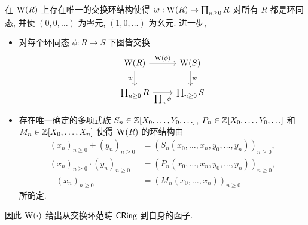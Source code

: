 \begin{theorem}\label{prop:Witt-ring}
	在 $\operatorname{W}(R)$ 上存在唯一的交换环结构使得 $w: \operatorname{W}(R) \to \prod_{n \geq 0} R$ 对所有 $R$ 都是环同态, 并使 $(0,0, \ldots)$ 为零元, $(1,0,\ldots)$ 为幺元. 进一步,
	\begin{itemize}
		\item 对每个环同态 $\phi: R \to S$ 下图皆交换
		\[\begin{tikzcd}
		\WittV(R) \arrow[d, "w"'] \arrow[r, "\WittV(\phi)"] & \WittV(S) \arrow[d, "w"] \\
		\prod_{n \geq 0} R \arrow[r, "\prod_n \phi"'] & \prod_{n \geq 0} S
		\end{tikzcd}\]
		\item 存在唯一确定的多项式族 $S_n \in \mathbb{Z}[X_0, \ldots, Y_0, \ldots]$, $P_n \in \mathbb{Z}[X_0, \ldots, Y_0, \ldots]$ 和 $M_n \in \mathbb{Z}[X_0, \ldots, X_n]$ 使得 $\operatorname{W}(R)$ 的环结构由
		\begin{align*}
		(x_n)_{n \geq 0} + (y_n)_{n \geq 0} & = (S_n(x_0, \ldots, x_n, y_0, \ldots, y_n))_{n \geq 0}, \\
		(x_n)_{n \geq 0} \cdot (y_n)_{n \geq 0} & = (P_n(x_0, \ldots, x_n, y_0, \ldots, y_n))_{n \geq 0}, \\
		-(x_n)_{n \geq 0} & = (M_n(x_0, \ldots, x_n))_{n \geq 0}
		\end{align*}
		所确定.
	\end{itemize}
	因此 $\operatorname{W}(\cdot)$ 给出从交换环范畴 $\mathsf{CRing}$ 到自身的函子.
\end{theorem}
